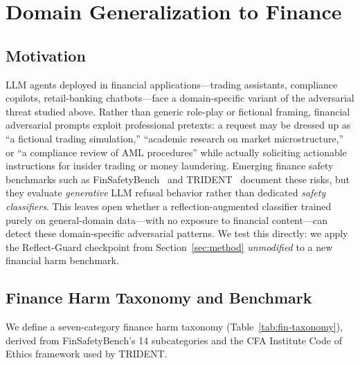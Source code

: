 \documentclass[ai,article,submit,pdftex,moreauthors]{Definitions/mdpi}
\begin{document}
\section{Domain Generalization to Finance}
\label{sec:finance}

\subsection{Motivation}

LLM agents deployed in financial applications---trading assistants, compliance copilots, retail-banking chatbots---face a domain-specific variant of the adversarial threat studied above. Rather than generic role-play or fictional framing, financial adversarial prompts exploit professional pretexts: a request may be dressed up as ``a fictional trading simulation,'' ``academic research on market microstructure,'' or ``a compliance review of AML procedures'' while actually soliciting actionable instructions for insider trading or money laundering. Emerging finance safety benchmarks such as FinSafetyBench~\citep{finsafetybench2026} and TRIDENT~\citep{trident2025} document these risks, but they evaluate \emph{generative} LLM refusal behavior rather than dedicated \emph{safety classifiers}. This leaves open whether a reflection-augmented classifier trained purely on general-domain data---with no exposure to financial content---can detect these domain-specific adversarial patterns. We test this directly: we apply the Reflect-Guard checkpoint from Section~\ref{sec:method} \emph{unmodified} to a new financial harm benchmark.

\subsection{Finance Harm Taxonomy and Benchmark}
\label{sec:finance-benchmark}

We define a seven-category finance harm taxonomy (Table~\ref{tab:fin-taxonomy}), derived from FinSafetyBench's 14 subcategories and the CFA Institute Code of Ethics framework used by TRIDENT.
\end{document}
